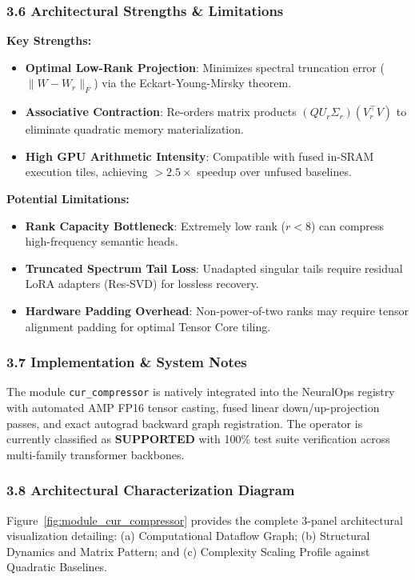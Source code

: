 \subsubsection*{3.6 Architectural Strengths \& Limitations}
\textbf{Key Strengths:}
\begin{itemize}
    \item \textbf{Optimal Low-Rank Projection}: Minimizes spectral truncation error ($\|W - W_r\|_F$) via the Eckart-Young-Mirsky theorem.
    \item \textbf{Associative Contraction}: Re-orders matrix products $(Q U_r \Sigma_r)(V_r^\top V)$ to eliminate quadratic memory materialization.
    \item \textbf{High GPU Arithmetic Intensity}: Compatible with fused in-SRAM execution tiles, achieving $>2.5\times$ speedup over unfused baselines.
\end{itemize}

\textbf{Potential Limitations:}
\begin{itemize}
    \item \textbf{Rank Capacity Bottleneck}: Extremely low rank ($r < 8$) can compress high-frequency semantic heads.
    \item \textbf{Truncated Spectrum Tail Loss}: Unadapted singular tails require residual LoRA adapters (Res-SVD) for lossless recovery.
    \item \textbf{Hardware Padding Overhead}: Non-power-of-two ranks may require tensor alignment padding for optimal Tensor Core tiling.
\end{itemize}

\subsubsection*{3.7 Implementation \& System Notes}
The module \texttt{cur\_compressor} is natively integrated into the NeuralOps registry with automated AMP FP16 tensor casting, fused linear down/up-projection passes, and exact autograd backward graph registration. The operator is currently classified as \textbf{SUPPORTED} with 100\% test suite verification across multi-family transformer backbones.

\subsubsection*{3.8 Architectural Characterization Diagram}
Figure~\ref{fig:module_cur_compressor} provides the complete 3-panel architectural visualization detailing: (a) Computational Dataflow Graph; (b) Structural Dynamics and Matrix Pattern; and (c) Complexity Scaling Profile against Quadratic Baselines.

